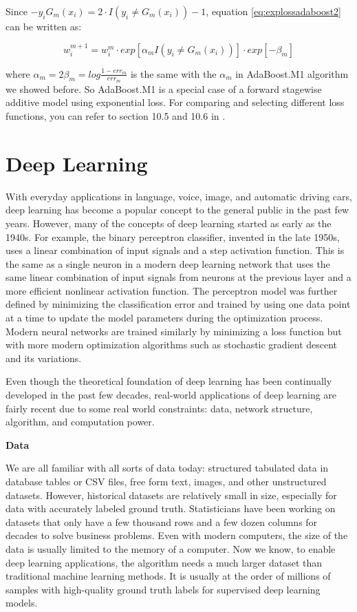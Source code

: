 \documentclass[12pt,]{krantz}
\begin{document}
Since \(-y_i G_m(x_i)=2\cdot I(y_i \neq G_m(x_i))-1\), equation \eqref{eq:explossadaboost2} can be written as:

\[w_i^{m+1}=w_i^m \cdot exp[\alpha_mI(y_i\neq G_m(x_i))] \cdot exp[-\beta_m]\]

where \(\alpha_m=2\beta_m=log\frac{1-err_m}{err_m}\) is the same with the \(\alpha_m\) in AdaBoost.M1 algorithm we showed before. So AdaBoost.M1 is a special case of a forward stagewise additive model using exponential loss. For comparing and selecting different loss functions, you can refer to section 10.5 and 10.6 in \citep{Hastie2008}.

\hypertarget{deeplearning}{%
\chapter{Deep Learning}\label{deeplearning}}

With everyday applications in language, voice, image, and automatic driving cars, deep learning has become a popular concept to the general public in the past few years. However, many of the concepts of deep learning started as early as the 1940s. For example, the binary perceptron classifier, invented in the late 1950s, uses a linear combination of input signals and a step activation function. This is the same as a single neuron in a modern deep learning network that uses the same linear combination of input signals from neurons at the previous layer and a more efficient nonlinear activation function. The perceptron model was further defined by minimizing the classification error and trained by using one data point at a time to update the model parameters during the optimization process. Modern neural networks are trained similarly by minimizing a loss function but with more modern optimization algorithms such as stochastic gradient descent and its variations.

Even though the theoretical foundation of deep learning has been continually developed in the past few decades, real-world applications of deep learning are fairly recent due to some real world constraints: data, network structure, algorithm, and computation power.

\textbf{Data}

We are all familiar with all sorts of data today: structured tabulated data in database tables or CSV files, free form text, images, and other unstructured datasets. However, historical datasets are relatively small in size, especially for data with accurately labeled ground truth. Statisticians have been working on datasets that only have a few thousand rows and a few dozen columns for decades to solve business problems. Even with modern computers, the size of the data is usually limited to the memory of a computer. Now we know, to enable deep learning applications, the algorithm needs a much larger dataset than traditional machine learning methods. It is usually at the order of millions of samples with high-quality ground truth labels for supervised deep learning models.
\end{document}
